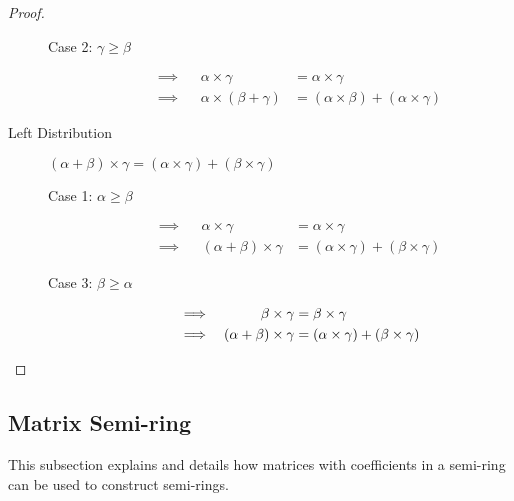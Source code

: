 \documentclass[runningheads]{llncs}
\begin{document}
\begin{proof}
\begin{description}
\begin{description}
				\item[Case 2: \(\gamma \geqslant \beta\)]
					\begin{align*}
						\implies &  & \alpha \times \gamma           & = \alpha \times \gamma                             \\
						\implies &  & \alpha \times (\beta + \gamma) & = (\alpha \times \beta ) + (\alpha \times \gamma )
					\end{align*}
			\end{description}

		\item[Left Distribution]
			\( (\alpha + \beta ) \times \gamma = (\alpha \times \gamma) + (\beta \times \gamma)\)
			\begin{description}
				\item[Case 1: \(\alpha \geqslant \beta\)]
					\begin{align*}
						\implies &  & \alpha \times \gamma            & = \alpha \times \gamma                             \\
						\implies &  & (\alpha + \beta ) \times \gamma & = (\alpha \times \gamma ) + (\beta \times \gamma )
					\end{align*}

				\item[Case 3: \(\beta \geqslant \alpha\)]
					\begin{align*}
						\implies &  & \beta \times \gamma             & = \beta \times \gamma                                       \\
						\implies &  & (\alpha + \beta ) \times \gamma & = (\alpha \times \gamma ) + (\beta \times \gamma ) \qedhere
					\end{align*}
			\end{description}

	\end{description}
\end{proof}

\subsection{Matrix Semi-ring}
\label{sec:app:matrix}

This subsection explains and details how matrices with coefficients in a semi-ring can be used to construct semi-rings.
\end{document}

